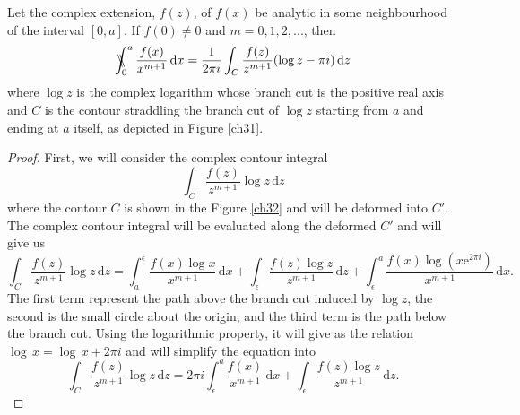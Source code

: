 \begin{theorem} \label{T3.1}
Let the complex extension, $f(z)$, of $f(x)$ be analytic in some neighbourhood of the interval $[0, a]$. If $f(0) \neq 0$ and $m = 0,1,2,...$, then
\begin{equation}
    \bbint{0}{a} \frac{f(x)}{x^{m+1}} \, \mathrm{d}x = \frac{1}{2 \pi i} \int_{C} \frac{f(z)}{z^{m+1}} (\log z - \pi i) \, \mathrm{d}z
\end{equation}
where $\log z$ is the complex logarithm whose branch cut is the positive real axis and $C$ is the contour straddling the branch cut of $\log z$ starting from $a$ and ending at $a$ itself, as depicted in Figure \ref{ch31}.
\end{theorem}

\begin{proof}
First, we will consider the complex contour integral 
\begin{equation}
    \int_{C} \frac{f(z)}{z^{m+1}} \log z \, \mathrm{d}z
\end{equation}
where the contour $C$ is shown in the Figure \ref{ch32} and will be deformed into $C'$. The complex contour integral will be evaluated along the deformed $C'$ and will give us
\begin{equation}
    \int_{C} \frac{f(z)}{z^{m+1}} \log z \, \mathrm{d}z = \int_a^{\epsilon} \frac{f(x) \log x}{x^{m+1}} \, \mathrm{d}x + \int_{\epsilon} \frac{f(z) \log z}{z^{m+1}} \, \mathrm{d}z + \int_\epsilon^a \frac{f(x) \log (x \mathrm{e}^{2 \pi i})}{x^{m+1}} \, \mathrm{d}x.       
\end{equation}
The first term represent the path above the branch cut  induced by $\log z$, the second is the small circle about the origin, and the third term is the path below the branch cut. Using the logarithmic property, it will give as the relation $\log \,x = \log \, x + 2 \pi i$ and will simplify the equation into 
\begin{equation}
    \int_{C} \frac{f(z)}{z^{m+1}} \log z \, \mathrm{d}z = 2 \pi i \int_{\epsilon}^a \frac{f(x)}{x^{m+1}} \, \mathrm{d}x + \int_{\epsilon} \frac{f(z) \log z}{z^{m+1}} \, \mathrm{d}z  . 
    \label{3.18}
\end{equation}


\end{proof}
